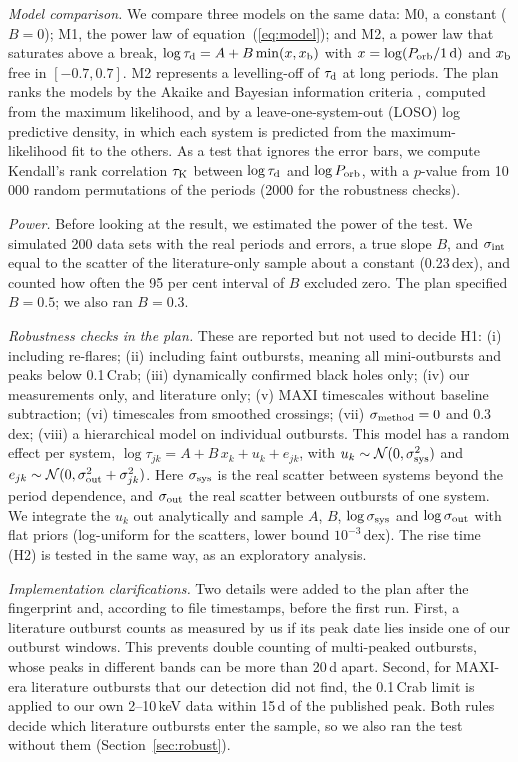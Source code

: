 \documentclass[fleqn,usenatbib]{mnras}
\newcommand{\taud}{\tau_{\rm d}}
\newcommand{\porb}{P_{\rm orb}}
\newcommand{\dex}{\,dex}
\begin{document}
\textit{Model comparison.} We compare three models on the same data: M0, a constant ($B=0$); M1, the power law of equation~(\ref{eq:model}); and M2, a power law that saturates above a break, $\log\taud=A+B\min(x,x_{\rm b})$ with $x=\log(\porb/1\,{\rm d})$ and $x_{\rm b}$ free in $[-0.7,0.7]$. M2 represents a levelling-off of $\taud$ at long periods. The plan ranks the models by the Akaike and Bayesian information criteria \citep[AIC, BIC;][]{Akaike1974,Schwarz1978}, computed from the maximum likelihood, and by a leave-one-system-out (LOSO) log predictive density, in which each system is predicted from the maximum-likelihood fit to the others. As a test that ignores the error bars, we compute Kendall's rank correlation $\tau_{\rm K}$ between $\log\taud$ and $\log\porb$, with a $p$-value from 10\,000 random permutations of the periods (2000 for the robustness checks).

\textit{Power.} Before looking at the result, we estimated the power of the test. We simulated 200 data sets with the real periods and errors, a true slope $B$, and $\sigma_{\rm int}$ equal to the scatter of the literature-only sample about a constant (0.23\dex), and counted how often the 95 per cent interval of $B$ excluded zero. The plan specified $B=0.5$; we also ran $B=0.3$.

\textit{Robustness checks in the plan.} These are reported but not used to decide H1:
(i) including re-flares;
(ii) including faint outbursts, meaning all mini-outbursts and peaks below 0.1\,Crab;
(iii) dynamically confirmed black holes only;
(iv) our measurements only, and literature only;
(v) MAXI timescales without baseline subtraction;
(vi) timescales from smoothed crossings;
(vii) $\sigma_{\rm method}=0$ and 0.3\dex;
(viii) a hierarchical model on individual outbursts. This model has a random effect per system, $\log\tau_{jk}=A+B\,x_k+u_k+e_{jk}$, with $u_k\sim\mathcal{N}(0,\sigma_{\rm sys}^2)$ and $e_{jk}\sim\mathcal{N}(0,\sigma_{\rm out}^2+\sigma_{jk}^2)$. Here $\sigma_{\rm sys}$ is the real scatter between systems beyond the period dependence, and $\sigma_{\rm out}$ the real scatter between outbursts of one system. We integrate the $u_k$ out analytically and sample $A$, $B$, $\log\sigma_{\rm sys}$ and $\log\sigma_{\rm out}$ with flat priors (log-uniform for the scatters, lower bound $10^{-3}$\dex).
The rise time (H2) is tested in the same way, as an exploratory analysis.

\textit{Implementation clarifications.} Two details were added to the plan after the fingerprint and, according to file timestamps, before the first run. First, a literature outburst counts as measured by us if its peak date lies inside one of our outburst windows. This prevents double counting of multi-peaked outbursts, whose peaks in different bands can be more than 20\,d apart. Second, for MAXI-era literature outbursts that our detection did not find, the 0.1\,Crab limit is applied to our own 2--10\,keV data within 15\,d of the published peak. Both rules decide which literature outbursts enter the sample, so we also ran the test without them (Section~\ref{sec:robust}).
\end{document}
